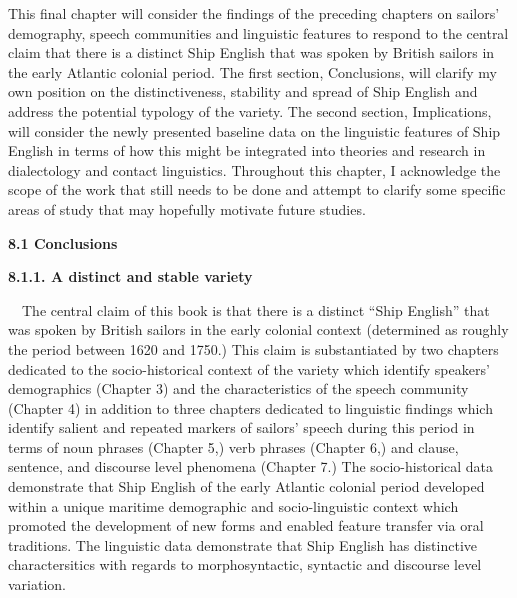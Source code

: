 \begin{styleStandard}
This final chapter will consider the findings of the preceding chapters on sailors’ demography, speech communities and linguistic features to respond to the central claim that there is a distinct Ship English that was spoken by British sailors in the early Atlantic colonial period. The first section, Conclusions, will clarify my own position on the distinctiveness, stability and spread of Ship English and address the potential typology of the variety. The second section, Implications, will consider the newly presented baseline data on the linguistic features of Ship English in terms of how this might be integrated into theories and research in dialectology and contact linguistics. Throughout this chapter, I acknowledge the scope of the work that still needs to be done and attempt to clarify some specific areas of study that may hopefully motivate future studies.
\end{styleStandard}


\begin{styleStandard}
\textbf{8.1 Conclusions}
\end{styleStandard}


\begin{styleStandard}
\textbf{8.1.1. A distinct and stable variety}
\end{styleStandard}


\begin{styleStandard}
\ \ The central claim of this book is that there is a distinct “Ship English” that was spoken by British sailors in the early colonial context (determined as roughly the period between 1620 and 1750.) This claim is substantiated by two chapters dedicated to the socio-historical context of the variety which identify speakers’ demographics (Chapter 3) and the characteristics of the speech community (Chapter 4) in addition to three chapters dedicated to linguistic findings which identify salient and repeated markers of sailors’ speech during this period in terms of noun phrases (Chapter 5,) verb phrases (Chapter 6,) and clause, sentence, and discourse level phenomena (Chapter 7.) The socio-historical data demonstrate that Ship English of the early Atlantic colonial period developed within a unique maritime demographic and socio-linguistic context which promoted the development of new forms and enabled feature transfer via oral traditions. The linguistic data demonstrate that Ship English has distinctive charactersitics with regards to morphosyntactic, syntactic and discourse level variation.
\end{styleStandard}


